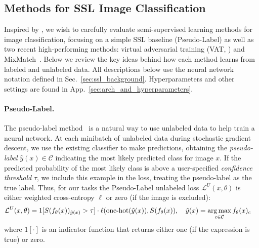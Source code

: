 

\subsection{Methods for SSL Image Classification}
\label{sec:Methods-SSL}

Inspired by \citet{oliverRealisticEvaluationDeep2018}, we wish to carefully evaluate semi-supervised learning methods for image classification, focusing on a simple SSL baseline (Pseudo-Label) as well as two recent high-performing methods: virtual adversarial training (VAT, \citep{miyatoVirtualAdversarialTraining2019}) and MixMatch~\citep{berthelotMixmatchHolisticApproach2019}. Below we review the key ideas behind how each method learns from labeled and unlabeled data.
All descriptions below use the neural network notation defined in Sec.~\ref{sec:ssl_background}.
Hyperparameters and other settings are found in App.~\ref{sec:arch_and_hyperparameters}.


\paragraph{Pseudo-Label.} The pseudo-label method~\citep{leePseudolabelSimpleEfficient2013} is a natural way to use unlabeled data to help train a neural network.
At each minibatch of unlabeled data during stochastic gradient descent, we use the existing classifier to make predictions,
 obtaining the \emph{pseudo-label} $\hat{y}(x) \in \mathcal{C}$ indicating the most likely predicted class for image $x$.
If the predicted probability of the most likely class is above a user-specified \emph{confidence threshold} $\tau$, we include this example in the loss, treating the pseudo-label as the true label.
Thus, for our tasks the Pseudo-Label unlabeled loss $\mathcal{L}^U(x, \theta)$ is either weighted cross-entropy $\ell$ or zero (if the image is excluded):
\begin{align}
    \mathcal{L}^U(x, \theta) &= 
		1[ S(f_{\theta}(x))_{\hat{y}(x)} > \tau ]
    	\cdot \ell( \text{one-hot}(\hat{y}(x)), S(f_{\theta}(x))
, \quad  \hat{y}(x) = \operatorname*{arg\,max}_{c \in \mathcal{C}} f_{\theta}(x)_c
\end{align}
where $1[ \cdot ]$ is an indicator function that returns either one (if the expression is true) or zero.

